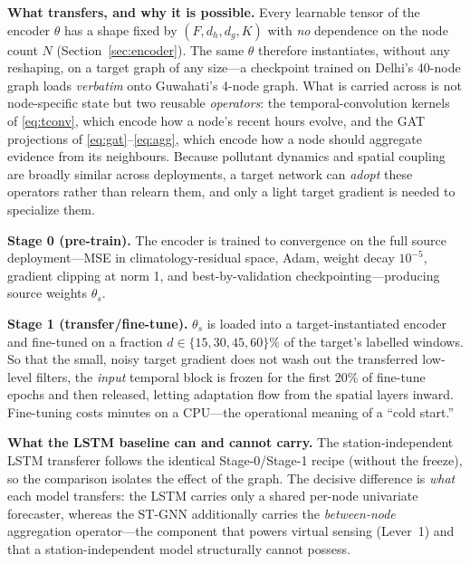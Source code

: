 \documentclass[journal]{IEEEtran}
\begin{document}
\textbf{What transfers, and why it is possible.} Every learnable tensor of the encoder $\theta$ has a shape fixed by $(F,d_h,d_g,K)$ with \emph{no} dependence on the node count $N$ (Section~\ref{sec:encoder}). The same $\theta$ therefore instantiates, without any reshaping, on a target graph of any size---a checkpoint trained on Delhi's 40-node graph loads \emph{verbatim} onto Guwahati's 4-node graph. What is carried across is not node-specific state but two reusable \emph{operators}: the temporal-convolution kernels of \eqref{eq:tconv}, which encode how a node's recent hours evolve, and the GAT projections of \eqref{eq:gat}--\eqref{eq:agg}, which encode how a node should aggregate evidence from its neighbours. Because pollutant dynamics and spatial coupling are broadly similar across deployments, a target network can \emph{adopt} these operators rather than relearn them, and only a light target gradient is needed to specialize them.

\textbf{Stage 0 (pre-train).} The encoder is trained to convergence on the full source deployment---MSE in climatology-residual space, Adam, weight decay $10^{-5}$, gradient clipping at norm 1, and best-by-validation checkpointing---producing source weights $\theta_s$.

\textbf{Stage 1 (transfer/fine-tune).} $\theta_s$ is loaded into a target-instantiated encoder and fine-tuned on a fraction $d\in\{15,30,45,60\}\%$ of the target's labelled windows. So that the small, noisy target gradient does not wash out the transferred low-level filters, the \emph{input} temporal block is frozen for the first 20\% of fine-tune epochs \cite{yosinski2014} and then released, letting adaptation flow from the spatial layers inward. Fine-tuning costs minutes on a CPU---the operational meaning of a ``cold start.''

\textbf{What the LSTM baseline can and cannot carry.} The station-independent LSTM transferer follows the identical Stage-0/Stage-1 recipe (without the freeze), so the comparison isolates the effect of the graph. The decisive difference is \emph{what} each model transfers: the LSTM carries only a shared per-node univariate forecaster, whereas the ST-GNN additionally carries the \emph{between-node} aggregation operator---the component that powers virtual sensing (Lever~1) and that a station-independent model structurally cannot possess.
\end{document}
